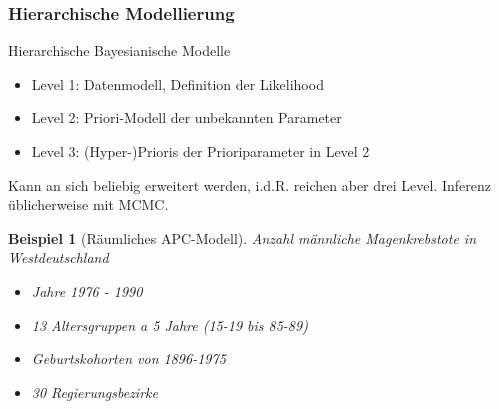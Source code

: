 \documentclass[german]{beamer}
\newtheorem{Bsp}{Beispiel}
\numberwithin{Bsp}{section}
\numberwithin{Def}{section}
\numberwithin{Stz}{section}
\begin{document}
\begin{frame}
\end{frame}

\subsubsection{Hierarchische Modellierung}
\begin{frame}{Hierarchische Bayesianische Modelle}
\begin{itemize}
\item[] Level 1: Datenmodell, Definition der Likelihood
\item[] Level 2: Priori-Modell der unbekannten Parameter
\item[] Level 3: (Hyper-)Prioris der Prioriparameter in Level 2
\end{itemize}
Kann an sich beliebig erweitert werden, i.d.R. reichen aber drei Level. Inferenz üblicherweise mit MCMC.
\end{frame}


\begin{frame}
\begin{Bsp}[Räumliches APC-Modell]
\label{bsp:raeumlichesapc}
Anzahl männliche Magenkrebstote in Westdeutschland
\begin{itemize}
\item Jahre 1976 - 1990
\item 13 Altersgruppen a 5 Jahre (15-19 bis 85-89)
\item Geburtskohorten von 1896-1975
\item 30 Regierungsbezirke
\end{itemize}
\end{Bsp}
\end{frame}
\end{document}
